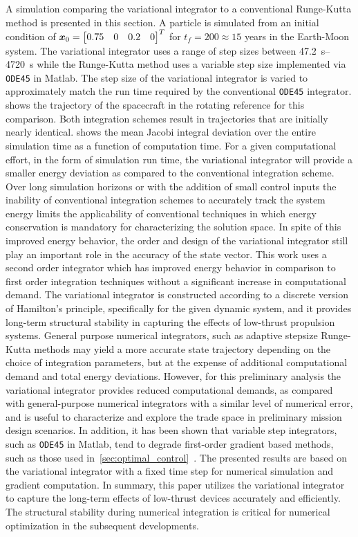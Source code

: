 \documentclass[smallcondensed]{svjour3}
\begin{document}
A simulation comparing the variational integrator to a conventional Runge-Kutta method is presented in this section.
A particle is simulated from an initial condition of \( \bm{x}_0 = \begin{bmatrix} 0.75 & 0 & 0.2 & 0\end{bmatrix}^T \) for \( t_f = 200 \approx 15\) years in the Earth-Moon system.
The variational integrator uses a range of step sizes between \SIrange{47.2}{4720}{\second} while the Runge-Kutta method uses a variable step size implemented via \texttt{ODE45} in Matlab.
The step size of the variational integrator is varied to approximately match the run time required by the conventional \texttt{ODE45} integrator.
 shows the trajectory of the spacecraft in the rotating reference for this comparison.
Both integration schemes result in trajectories that are initially nearly identical.
 shows the mean Jacobi integral deviation over the entire simulation time as a function of computation time.
For a given computational effort, in the form of simulation run time, the variational integrator will provide a smaller energy deviation as compared to the conventional integration scheme.
Over long simulation horizons or with the addition of small control inputs the inability of conventional integration schemes to accurately track the system energy limits the applicability of conventional techniques in which energy conservation is mandatory for characterizing the solution space.
In spite of this improved energy behavior, the order and design of the variational integrator still play an important role in the accuracy of the state vector.
This work uses a second order integrator which has improved energy behavior in comparison to first order integration techniques without a significant increase in computational demand.
The variational integrator is constructed according to a discrete version of Hamilton's principle, specifically for the given dynamic system, and it provides long-term structural stability in capturing the effects of low-thrust propulsion systems.
General purpose numerical integrators, such as adaptive stepsize Runge-Kutta methods may yield a more accurate state trajectory depending on the choice of integration parameters, but at the expense of additional computational demand and total energy deviations.
However, for this preliminary analysis the variational integrator provides reduced computational demands, as compared with general-purpose numerical integrators with a similar level of numerical error, and is useful to characterize and explore the trade space in preliminary mission design scenarios.
In addition, it has been shown that variable step integrators, such as \texttt{ODE45} in Matlab, tend to degrade first-order gradient based methods, such as those used in~\cref{sec:optimal_control}~\cite{pellegrini2016}.
The presented results are based on the variational integrator with a fixed time step for numerical simulation and gradient computation.
In summary, this paper utilizes the variational integrator to capture the long-term effects of low-thrust devices accurately and efficiently.
The structural stability during numerical integration is critical for numerical optimization in the subsequent developments.
\end{document}
